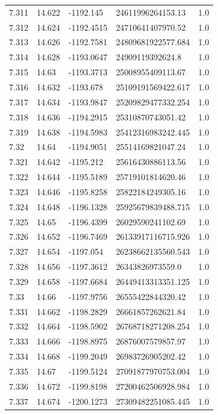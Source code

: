 \begin{tabular}{lllll}
7.311 & 14.622 & -1192.145 & 24611996264153.13 & 1.0 \\
7.312 & 14.624 & -1192.4515 & 24710641407970.52 & 1.0 \\
7.313 & 14.626 & -1192.7581 & 24809681922577.684 & 1.0 \\
7.314 & 14.628 & -1193.0647 & 24909119392624.8 & 1.0 \\
7.315 & 14.63 & -1193.3713 & 25008955409113.67 & 1.0 \\
7.316 & 14.632 & -1193.678 & 25109191569422.617 & 1.0 \\
7.317 & 14.634 & -1193.9847 & 25209829477332.254 & 1.0 \\
7.318 & 14.636 & -1194.2915 & 25310870743051.42 & 1.0 \\
7.319 & 14.638 & -1194.5983 & 25412316983242.445 & 1.0 \\
7.32 & 14.64 & -1194.9051 & 25514169821047.24 & 1.0 \\
7.321 & 14.642 & -1195.212 & 25616430886113.56 & 1.0 \\
7.322 & 14.644 & -1195.5189 & 25719101814620.46 & 1.0 \\
7.323 & 14.646 & -1195.8258 & 25822184249305.16 & 1.0 \\
7.324 & 14.648 & -1196.1328 & 25925679839488.715 & 1.0 \\
7.325 & 14.65 & -1196.4399 & 26029590241102.69 & 1.0 \\
7.326 & 14.652 & -1196.7469 & 26133917116715.926 & 1.0 \\
7.327 & 14.654 & -1197.054 & 26238662135560.543 & 1.0 \\
7.328 & 14.656 & -1197.3612 & 26343826973559.0 & 1.0 \\
7.329 & 14.658 & -1197.6684 & 26449413313351.125 & 1.0 \\
7.33 & 14.66 & -1197.9756 & 26555422844320.42 & 1.0 \\
7.331 & 14.662 & -1198.2829 & 26661857262621.84 & 1.0 \\
7.332 & 14.664 & -1198.5902 & 26768718271208.254 & 1.0 \\
7.333 & 14.666 & -1198.8975 & 26876007579857.97 & 1.0 \\
7.334 & 14.668 & -1199.2049 & 26983726905202.42 & 1.0 \\
7.335 & 14.67 & -1199.5124 & 27091877970753.004 & 1.0 \\
7.336 & 14.672 & -1199.8198 & 27200462506928.984 & 1.0 \\
7.337 & 14.674 & -1200.1273 & 27309482251085.445 & 1.0 \\

\end{tabular}
